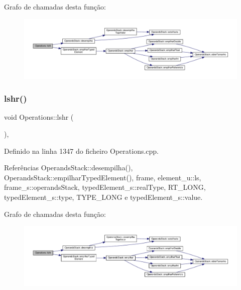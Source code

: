 Grafo de chamadas desta função\+:
\nopagebreak
\begin{figure}[H]
\begin{center}
\leavevmode
\includegraphics[width=350pt]{classOperations_a9d2b2a5ea74f26e6a5005ec9e99b24d9_cgraph}
\end{center}
\end{figure}
\mbox{\label{classOperations_aa886b0d027fb5b030016af6100541e81}} 
\subsubsection{\texorpdfstring{lshr()}{lshr()}}
{\footnotesize\ttfamily void Operations\+::lshr (\begin{DoxyParamCaption}{ }\end{DoxyParamCaption})\hspace{0.3cm}{\ttfamily [static]}, {\ttfamily [private]}}



Definido na linha 1347 do ficheiro Operations.\+cpp.



Referências Operands\+Stack\+::desempilha(), Operands\+Stack\+::empilhar\+Typed\+Element(), frame, element\+\_\+u\+::ls, frame\+\_\+s\+::operands\+Stack, typed\+Element\+\_\+s\+::real\+Type, R\+T\+\_\+\+L\+O\+NG, typed\+Element\+\_\+s\+::type, T\+Y\+P\+E\+\_\+\+L\+O\+NG e typed\+Element\+\_\+s\+::value.

Grafo de chamadas desta função\+:
\nopagebreak
\begin{figure}[H]
\begin{center}
\leavevmode
\includegraphics[width=350pt]{classOperations_aa886b0d027fb5b030016af6100541e81_cgraph}
\end{center}
\end{figure}
\mbox{\label{classOperations_a233917ec136fa6ce064f04b410e15f87}} 
